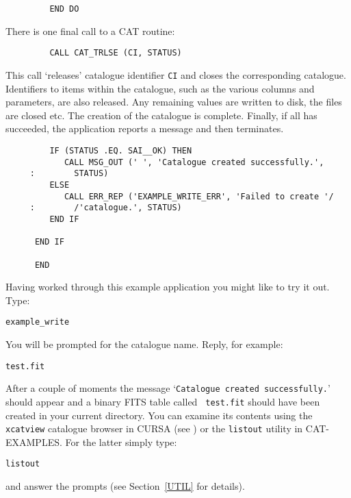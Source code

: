\begin{verbatim}
         END DO
\end{verbatim}

There is one final call to a CAT routine:

\begin{verbatim}
         CALL CAT_TRLSE (CI, STATUS)
\end{verbatim}

This call `releases' catalogue identifier {\tt CI} and closes the
corresponding catalogue. Identifiers to items within the catalogue, such
as the various columns and parameters, are also released. Any remaining 
values are written to disk, the files are closed etc. The creation of 
the catalogue is complete. Finally, if all has succeeded, the 
application reports a message and then terminates.

\begin{verbatim}
         IF (STATUS .EQ. SAI__OK) THEN
            CALL MSG_OUT (' ', 'Catalogue created successfully.', 
     :        STATUS)
         ELSE
            CALL ERR_REP ('EXAMPLE_WRITE_ERR', 'Failed to create '/
     :        /'catalogue.', STATUS)
         END IF

      END IF

      END
\end{verbatim}

Having worked through this example application you might like to try
it out. Type:

\begin{verbatim}
example_write
\end{verbatim}

You will be prompted for the catalogue name. Reply, for example:

\begin{verbatim}
test.fit
\end{verbatim}

After a couple of moments the message `{\tt Catalogue created 
successfully.}' should appear and a binary FITS table called {\tt 
test.fit} should have been created in your current directory. You can 
examine its contents using the {\tt xcatview} catalogue browser in
CURSA (see \cite{SUN190}) or the {\tt listout}
utility in CAT-EXAMPLES.  For the latter simply type:

\begin{verbatim}
listout
\end{verbatim}

and answer the prompts (see Section~\ref{UTIL} for details).


